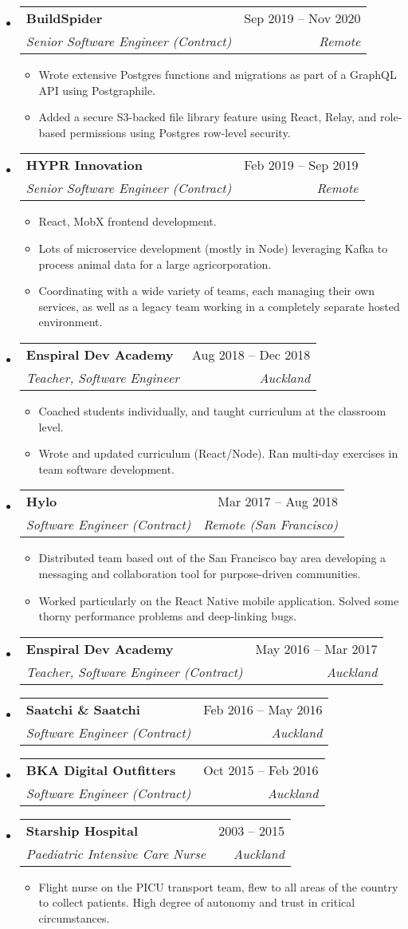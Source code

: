 \documentclass[12pt]{article}
\makeatletter
\newcommand{\resumeEntry}[1]{\begin{itemize}[leftmargin=2.5mm]#1\end{itemize}}
\newcommand{\resumeItemList}[1]{\begin{itemize}[leftmargin=4.5mm]#1\end{itemize}}
\newcommand{\resumeItem}[1]{
  \item\small{
    {#1 \vspace{-0.9ex}}
  }
}
\newcommand{\resumeEntryTSDL}[4]{
  \vspace{-0.5ex}\item[]
    \begin{tabularx}{0.97\textwidth}{X@{\hspace{5em}}r}
      \textbf{\color{primary}#1} & {\firabook\color{accent}\small#2} \\
      \textit{\color{accent}\small#3} & \textit{\color{accent}\small#4} \\
    \end{tabularx}\vspace{-0.9ex}
}
\makeatother
\begin{document}
  \resumeEntry{
    \resumeEntryTSDL
      {BuildSpider}{Sep 2019 -- Nov 2020}
      {Senior Software Engineer (Contract)}{Remote}
    \resumeItemList{
      \resumeItem {Wrote extensive Postgres functions and migrations as part of a GraphQL API using Postgraphile.}
      \resumeItem {Added a secure S3-backed file library feature using React, Relay, and role-based permissions using Postgres row-level security.}
    }
  }

  \resumeEntry{
    \resumeEntryTSDL
      {HYPR Innovation}{Feb 2019 -- Sep 2019}
      {Senior Software Engineer (Contract)}{Remote}
    \resumeItemList{
      \resumeItem {React, MobX frontend development.}
      \resumeItem {Lots of microservice development (mostly in Node) leveraging Kafka to process animal data for a large agricorporation.}
      \resumeItem {Coordinating with a wide variety of teams, each managing their own services, as well as a legacy team working in a completely separate hosted environment.}
    }
  }

  \resumeEntry{
    \resumeEntryTSDL
      {Enspiral Dev Academy}{Aug 2018 -- Dec 2018}
      {Teacher, Software Engineer}{Auckland}
    \resumeItemList{
      \resumeItem {Coached students individually, and taught curriculum at the classroom level.}
      \resumeItem {Wrote and updated curriculum (React/Node). Ran multi-day exercises in team software development.}
    }
  }

  \resumeEntry{
    \resumeEntryTSDL
      {Hylo}{Mar 2017 -- Aug 2018}
      {Software Engineer (Contract)}{Remote (San Francisco)}
    \resumeItemList{
      \resumeItem {Distributed team based out of the San Francisco bay area developing a messaging and collaboration tool for purpose-driven communities.}
      \resumeItem {Worked particularly on the React Native mobile application. Solved some thorny performance problems and deep-linking bugs.}
    }
  }

  \resumeEntry{
    \resumeEntryTSDL
      {Enspiral Dev Academy}{May 2016 -- Mar 2017}
      {Teacher, Software Engineer (Contract)}{Auckland}
  }

  \resumeEntry{
    \resumeEntryTSDL
      {Saatchi \& Saatchi}{Feb 2016 -- May 2016}
      {Software Engineer (Contract)}{Auckland}
  }

  \resumeEntry{
    \resumeEntryTSDL
      {BKA Digital Outfitters}{Oct 2015 -- Feb 2016}
      {Software Engineer (Contract)}{Auckland}
  }

  \resumeEntry{
    \resumeEntryTSDL
      {Starship Hospital}{2003 -- 2015}
      {Paediatric Intensive Care Nurse}{Auckland}
    \resumeItemList{
      \resumeItem {Flight nurse on the PICU transport team, flew to all areas of the country to collect patients. High degree of autonomy and trust in critical circumstances.}
    }
  }
\end{document}
